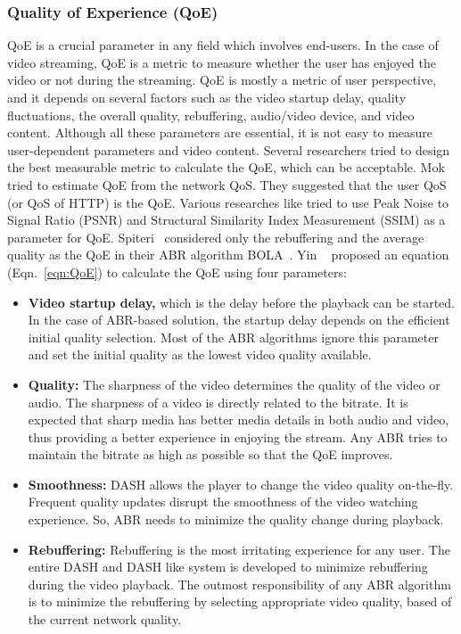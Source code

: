 \subsubsection{Quality of Experience (QoE)}
QoE is a crucial parameter in any field which involves end-users. In the case of video streaming, QoE is a metric to measure whether the user has enjoyed the video or not during the streaming. QoE is mostly a metric of user perspective, and it depends on several factors such as the video startup delay, quality fluctuations, the overall quality, rebuffering, audio/video device, and video content. Although all these parameters are essential, it is not easy to measure user-dependent parameters and video content. Several researchers tried to design the best measurable metric to calculate the QoE, which can be acceptable. Mok \etal \cite{5990550} tried to estimate QoE from the network QoS. They suggested that the user QoS (or QoS of HTTP) is the QoE. Various researches like \cite{10.1145/2155555.2155558,10.1145/3394171.3413512} tried to use Peak Noise to Signal Ratio (PSNR) and Structural Similarity Index Measurement (SSIM) as a parameter for QoE. Spiteri \etal\ considered only the rebuffering and the average quality as the QoE in their ABR algorithm BOLA~\cite{Spiteri2016}. Yin \etal~\cite{yin2015control} proposed an equation (Eqn.~\ref{eqn:QoE}) to calculate the QoE using four parameters:
\begin{itemize}
	\item {\bf Video startup delay,} which is the delay before the playback can be started. In the case of ABR-based solution, the startup delay depends on the efficient initial quality selection. Most of the ABR algorithms ignore this parameter and set the initial quality as the lowest video quality available.
	\item {\bf Quality:} The sharpness of the video determines the quality of the video or audio. The sharpness of a video is directly related to the bitrate. It is expected that sharp media has better media details in both audio and video, thus providing a better experience in enjoying the stream. Any ABR tries to maintain the bitrate as high as possible so that the QoE improves.
	\item {\bf Smoothness:} DASH allows the player to change the video quality on-the-fly. Frequent quality updates disrupt the smoothness of the video watching experience. So, ABR needs to minimize the quality change during playback.
	\item {\bf Rebuffering:} Rebuffering is the most irritating experience for any user. The entire DASH and DASH like system is developed to minimize rebuffering during the video playback. The outmost responsibility of any ABR algorithm is to minimize the rebuffering by selecting appropriate video quality, based of the current network quality.
\end{itemize}
